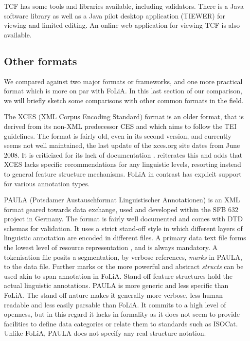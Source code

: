 \documentclass[a4paper,10pt,twoside]{article}
\begin{document}
TCF has some tools and libraries available, including validators. There is a
Java software library as well as a Java pilot desktop application (TIEWER) for
viewing and limited editing. An online web application for viewing TCF is also
available.


\subsection{Other formats}

We compared against two major formats or frameworks, and one more practical format which is
more on par with FoLiA. In this last section of our comparison, we will briefly
sketch some comparisons with other common formats in the field.

The XCES (XML Corpus Encoding Standard) format is an older format, that is
derived from its non-XML predecessor CES \cite{XCES} and which aims to follow the TEI
guidelines. The format is fairly old, even in its second version, and currently seems not well maintained, the last update of the xces.org site dates from June 2008. It is criticized for its lack of documentation \cite{TEICORPUSANNOT}. \cite{prze09}
reiterates this and adds that XCES lacks specific recommendations for any
linguistic levels, resorting instead to general feature structure mechanisms.
FoLiA in contrast has explicit support for various annotation types.

PAULA (Potsdamer Austauschformat Linguistischer Annotationen) is an XML format
geared towards data exchange, used and developed within the SFB 632 project in
Germany. The format is fairly well documented and comes with DTD schemas for
validation. It uses a strict stand-off style in which different layers of
linguistic annotation are encoded in different files. A primary data text file
forms the lowest level of resource representation \cite{PAULA}, and is always
mandatory. A tokenisation file posits a segmentation, by verbose references,
\emph{marks} in PAULA, to the data file. Further marks or the more powerful and
abstract \emph{structs} can be used akin to span annotation in FoLiA.
Stand-off feature structures hold the actual linguistic annotations. PAULA is
more generic and less specific than FoLiA. The stand-off nature makes it
generally more verbose, less human-readable and less easily parsable than
FoLiA. It commits to a high level of openness, but in this regard it lacks in
formality as it does not seem to provide facilities to define data categories
or relate them to standards such as ISOCat.  Unlike FoLiA, PAULA does not
specify any real structure notation.
\end{document}
